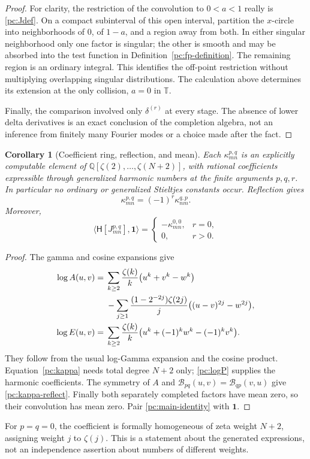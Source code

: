 \documentclass[11pt,a4paper]{article}
\numberwithin{equation}{section}
\newtheorem{corollary}[theorem]{Corollary}
\theoremstyle{definition}
\newcommand{\T}{\mathbb T}
\newcommand{\Q}{\mathbb Q}
\newcommand{\HH}{\mathsf H}
\newcommand{\BF}{\mathcal B}
\newcommand{\one}{\mathbf 1}
\begin{document}
\begin{proof}
For clarity, the restriction of the convolution to $0<a<1$ really is \eqref{pc:Jdef}. On a compact subinterval of this open interval, partition the $x$-circle into neighborhoods of $0$, of $1-a$, and a region away from both. In either singular neighborhood only one factor is singular; the other is smooth and may be absorbed into the test function in Definition~\ref{pc:fp-definition}. The remaining region is an ordinary integral. This identifies the off-point restriction without multiplying overlapping singular distributions. The calculation above determines its extension at the only collision, $a=0$ in $\T$.

Finally, the comparison involved only $\delta^{(r)}$ at every stage. The absence of lower delta derivatives is an exact conclusion of the completion algebra, not an inference from finitely many Fourier modes or a choice made after the fact.
\end{proof}

\begin{corollary}[Coefficient ring, reflection, and mean]\label{pc:ring}
Each $\kappa_{mn}^{p,q}$ is an explicitly computable element of
$\Q[\zeta(2),\ldots,\zeta(N+2)]$, with rational coefficients expressible through generalized harmonic numbers at the finite arguments $p,q,r$. In particular no ordinary or generalized Stieltjes constants occur. Reflection gives
\begin{equation}\label{pc:kappa-reflect}
\kappa_{mn}^{p,q}=(-1)^r\kappa_{nm}^{q,p}.
\end{equation}
Moreover,
\begin{equation}\label{pc:mean}
\langle\HH[J_{mn}^{p,q}],\one\rangle=
\begin{cases}-\kappa_{mn}^{0,0},&r=0,\\0,&r>0.\end{cases}
\end{equation}
\end{corollary}
\begin{proof}
The gamma and cosine expansions give
\begin{align}
\log A(u,v)={}&\sum_{k\ge2}\frac{\zeta(k)}k\big(u^k+v^k-w^k\big)\notag\\
&-\sum_{j\ge1}\frac{(1-2^{-2j})\zeta(2j)}j
\big((u-v)^{2j}-w^{2j}\big),\label{pc:logA}\\
\log E(u,v)={}&\sum_{k\ge2}\frac{\zeta(k)}k
\big(u^k+(-1)^kw^k-(-1)^kv^k\big).\label{pc:logE}
\end{align}
They follow from the usual log-Gamma expansion \cite{pc:gamma} and the cosine product. Equation~\eqref{pc:kappa} needs total degree $N+2$ only; \eqref{pc:logP} supplies the harmonic coefficients. The symmetry of $A$ and $\BF_{pq}(u,v)=\BF_{qp}(v,u)$ give \eqref{pc:kappa-reflect}. Finally both separately completed factors have mean zero, so their convolution has mean zero. Pair \eqref{pc:main-identity} with $\one$.
\end{proof}
For $p=q=0$, the coefficient is formally homogeneous of zeta weight $N+2$, assigning weight $j$ to $\zeta(j)$. This is a statement about the generated expressions, not an independence assertion about numbers of different weights.
\end{document}
